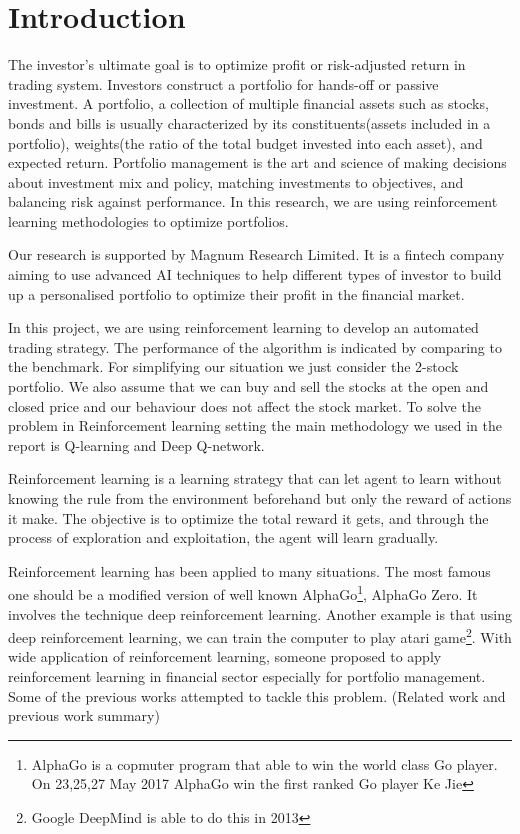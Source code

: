 \chapter{Introduction}\label{Ch:Introduction}

The investor’s ultimate goal is to optimize profit or risk-adjusted return in trading system. Investors construct a portfolio for hands-off or passive investment. A portfolio, a collection of multiple financial assets such as stocks, bonds and bills is usually characterized by its constituents(assets included in a portfolio), weights(the ratio of the total budget invested into each asset), and expected return. Portfolio management is the art and science of making decisions about investment mix and policy, matching investments to objectives, and balancing risk against performance. In this research, we are using reinforcement learning methodologies to optimize portfolios. 

Our research is supported by Magnum Research Limited. It is a fintech company aiming to use advanced AI techniques to help different types of investor to build up a personalised portfolio to optimize their profit in the financial market.

In this project, we are using reinforcement learning to develop an automated trading strategy. The performance of the algorithm is indicated by comparing to the benchmark. For simplifying our situation we just consider the 2-stock portfolio. We also assume that we can buy and sell the stocks at the open and closed price and our behaviour does not affect the stock market. To solve the problem in Reinforcement learning setting the main methodology we used in the report is Q-learning and Deep Q-network. 

Reinforcement learning is a learning strategy that can let agent to learn without knowing the rule from the environment beforehand but only the reward of actions it make. The objective is to optimize the total reward it gets, and through the process of exploration and exploitation, the agent will learn gradually.

Reinforcement learning has been applied to many situations. The most famous one should be a modified version of well known AlphaGo\footnote{AlphaGo is a copmuter program that able to win the world class Go player. On 23,25,27 May 2017 AlphaGo win the first ranked Go player Ke Jie}, AlphaGo Zero. It involves the technique deep reinforcement learning. Another example is that using deep reinforcement learning, we can train the computer to play atari game\footnote{Google DeepMind is able to do this in 2013}.\cite{Playing} With wide application of reinforcement learning, someone proposed to apply reinforcement learning in financial sector especially for portfolio management. Some of the previous works attempted to tackle this problem. (Related work and previous work summary)
